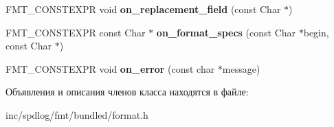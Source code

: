 \begin{DoxyCompactItemize}
F\+M\+T\+\_\+\+C\+O\+N\+S\+T\+E\+X\+PR void {\bfseries on\+\_\+replacement\+\_\+field} (const Char $\ast$)
\item 
\mbox{\label{classinternal_1_1format__string__checker_ab58cc5258709ff65992f15b42eb53259}} 
F\+M\+T\+\_\+\+C\+O\+N\+S\+T\+E\+X\+PR const Char $\ast$ {\bfseries on\+\_\+format\+\_\+specs} (const Char $\ast$begin, const Char $\ast$)
\item 
\mbox{\label{classinternal_1_1format__string__checker_a4436018134529c7b630b05bef2342b89}} 
F\+M\+T\+\_\+\+C\+O\+N\+S\+T\+E\+X\+PR void {\bfseries on\+\_\+error} (const char $\ast$message)
\end{DoxyCompactItemize}


Объявления и описания членов класса находятся в файле\+:\begin{DoxyCompactItemize}
\item 
inc/spdlog/fmt/bundled/format.\+h\end{DoxyCompactItemize}
